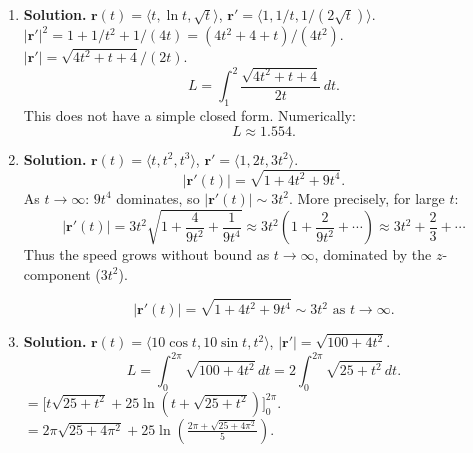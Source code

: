 \begin{enumerate}
This is an incomplete elliptic integral of the second kind. With $k^2=7/9$:
$=24000\,E\!\left(\sqrt{7/9}\right)\cdot\frac{\pi}{2}$---no, the standard form is $E(k)=\int_0^{\pi/2}\sqrt{1-k^2\sin^2 t}\,dt$.

We have $\sqrt{1+(7/9)\sin^2 t}$. Rewrite: $9+7\sin^2 t=16-7\cos^2 t$, so $\sqrt{9+7\sin^2 t}=4\sqrt{1-\frac{7}{16}\cos^2 t}$.

Let $u=\pi/2-t$: $\int_0^{\pi/2}\sqrt{1-\frac{7}{16}\cos^2 t}\,dt=\int_0^{\pi/2}\sqrt{1-\frac{7}{16}\sin^2 u}\,du = E\!\left(\sqrt{7/16}\right)=E\!\left(\frac{\sqrt{7}}{4}\right)$.

So $L=8000\cdot 4\,E\!\left(\frac{\sqrt{7}}{4}\right)=32000\,E\!\left(\frac{\sqrt{7}}{4}\right)$.

Numerically, $k=\sqrt{7}/4\approx 0.6614$, $E(0.6614)\approx 1.3556$.
$L\approx 32000\times 1.3556\approx 43{,}379$ km.

For context, this is the circumference of an ellipse with semi-major axis $a=8000$ and semi-minor axis $b=6000$: $L=4aE(e)$ where eccentricity $e=\sqrt{1-b^2/a^2}=\sqrt{1-9/16}=\sqrt{7}/4$.

\[
\boxed{L = 4\cdot 8000\cdot E\!\left(\frac{\sqrt{7}}{4}\right) = 32000\,E\!\left(\frac{\sqrt{7}}{4}\right)\approx 43{,}379\text{ km}.}
\]

\item \textbf{Solution.}
$\mathbf{r}(t)=\langle t, \ln t, \sqrt{t}\rangle$, $\mathbf{r}'=\langle 1, 1/t, 1/(2\sqrt{t})\rangle$.
$|\mathbf{r}'|^2=1+1/t^2+1/(4t)=(4t^2+4+t)/(4t^2)$.
$|\mathbf{r}'|=\sqrt{4t^2+t+4}/(2t)$.
\[
L=\int_1^2\frac{\sqrt{4t^2+t+4}}{2t}\,dt.
\]
This does not have a simple closed form. Numerically:
\[
\boxed{L\approx 1.554.}
\]

\item \textbf{Solution.}
$\mathbf{r}(t)=\langle t, t^2, t^3\rangle$, $\mathbf{r}'=\langle 1,2t,3t^2\rangle$.
\[
|\mathbf{r}'(t)|=\sqrt{1+4t^2+9t^4}.
\]
As $t\to\infty$: $9t^4$ dominates, so $|\mathbf{r}'(t)|\sim 3t^2$.
More precisely, for large $t$:
\[
|\mathbf{r}'(t)|=3t^2\sqrt{1+\frac{4}{9t^2}+\frac{1}{9t^4}} \approx 3t^2\left(1+\frac{2}{9t^2}+\cdots\right) \approx 3t^2+\frac{2}{3}+\cdots
\]
Thus the speed grows without bound as $t\to\infty$, dominated by the $z$-component ($3t^2$).

\[
\boxed{|\mathbf{r}'(t)|=\sqrt{1+4t^2+9t^4}\sim 3t^2 \text{ as } t\to\infty.}
\]

\item \textbf{Solution.}
$\mathbf{r}(t)=\langle 10\cos t, 10\sin t, t^2\rangle$, $|\mathbf{r}'|=\sqrt{100+4t^2}$.
\[
L=\int_0^{2\pi}\sqrt{100+4t^2}\,dt = 2\int_0^{2\pi}\sqrt{25+t^2}\,dt.
\]
$=\bigl[t\sqrt{25+t^2}+25\ln(t+\sqrt{25+t^2})\bigr]_0^{2\pi}$.
$=2\pi\sqrt{25+4\pi^2}+25\ln\!\left(\frac{2\pi+\sqrt{25+4\pi^2}}{5}\right)$.


\end{enumerate}
